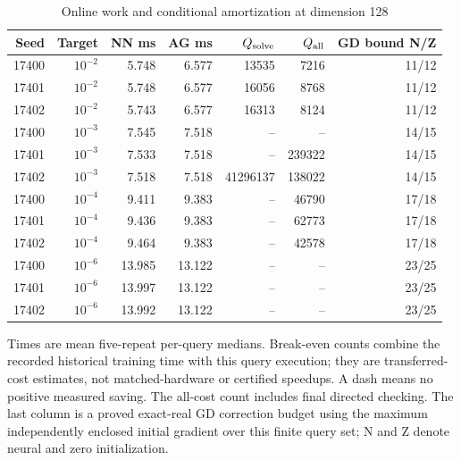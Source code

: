\begin{table}[htbp]
\centering\small
\caption{Online work and conditional amortization at dimension 128}\label{tab:r19timing128}
\begin{tabular}{rrrrrrr}\toprule
Seed & Target & NN ms & AG ms & $Q_{\rm solve}$ & $Q_{\rm all}$ & GD bound N/Z\\
\midrule
17400 & $10^{-2}$ & 5.748 & 6.577 & 13535 & 7216 & 11/12\\
17401 & $10^{-2}$ & 5.748 & 6.577 & 16056 & 8768 & 11/12\\
17402 & $10^{-2}$ & 5.743 & 6.577 & 16313 & 8124 & 11/12\\
17400 & $10^{-3}$ & 7.545 & 7.518 & -- & -- & 14/15\\
17401 & $10^{-3}$ & 7.533 & 7.518 & -- & 239322 & 14/15\\
17402 & $10^{-3}$ & 7.518 & 7.518 & 41296137 & 138022 & 14/15\\
17400 & $10^{-4}$ & 9.411 & 9.383 & -- & 46790 & 17/18\\
17401 & $10^{-4}$ & 9.436 & 9.383 & -- & 62773 & 17/18\\
17402 & $10^{-4}$ & 9.464 & 9.383 & -- & 42578 & 17/18\\
17400 & $10^{-6}$ & 13.985 & 13.122 & -- & -- & 23/25\\
17401 & $10^{-6}$ & 13.997 & 13.122 & -- & -- & 23/25\\
17402 & $10^{-6}$ & 13.992 & 13.122 & -- & -- & 23/25\\
\bottomrule
\end{tabular}
\par\smallskip\begin{minipage}{.98\textwidth}\footnotesize Times are mean five-repeat per-query medians. Break-even counts combine the recorded historical training time with this query execution; they are transferred-cost estimates, not matched-hardware or certified speedups. A dash means no positive measured saving. The all-cost count includes final directed checking. The last column is a proved exact-real GD correction budget using the maximum independently enclosed initial gradient over this finite query set; N and Z denote neural and zero initialization.\end{minipage}
\end{table}
